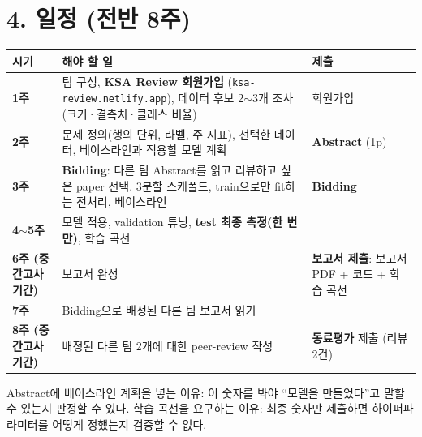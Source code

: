 \documentclass[12pt]{article}
\begin{document}
\section*{4. 일정 (전반 8주)}
\begin{center}
\small
\begin{tabular}{@{}p{3.6cm}p{5.4cm}p{3.7cm}@{}}
\toprule
\textbf{시기} & \textbf{해야 할 일} & \textbf{제출} \\
\midrule
\textbf{1주} & 팀 구성, \textbf{KSA Review 회원가입} (\texttt{ksa-review.netlify.app}), 데이터 후보 2$\sim$3개 조사(크기·결측치·클래스 비율) & 회원가입 \\
\textbf{2주} & 문제 정의(행의 단위, 라벨, 주 지표), 선택한 데이터, 베이스라인과 적용할 모델 계획 & \textbf{Abstract} (1p) \\
\textbf{3주} & \textbf{Bidding}: 다른 팀 Abstract를 읽고 리뷰하고 싶은 paper 선택. 3분할 스캐폴드, train으로만 fit하는 전처리, 베이스라인 & \textbf{Bidding} \\
\textbf{4$\sim$5주} & 모델 적용, validation 튜닝, \textbf{test 최종 측정(한 번만)}, 학습 곡선 &  \\
\textbf{6주 (중간고사 기간)} & 보고서 완성 & \textbf{보고서 제출}: 보고서 PDF + 코드 + 학습 곡선 \\
\textbf{7주} & Bidding으로 배정된 다른 팀 보고서 읽기 &  \\
\textbf{8주 (중간고사 기간)} & 배정된 다른 팀 2개에 대한 peer-review 작성 & \textbf{동료평가} 제출 (리뷰 2건) \\
\bottomrule
\end{tabular}
\end{center}
\vspace{4pt}
Abstract에 베이스라인 계획을 넣는 이유: 이 숫자를 봐야 ``모델을
만들었다''고 말할 수 있는지 판정할 수 있다. 학습 곡선을 요구하는 이유:
최종 숫자만 제출하면 하이퍼파라미터를 어떻게 정했는지 검증할 수 없다.
\end{document}
